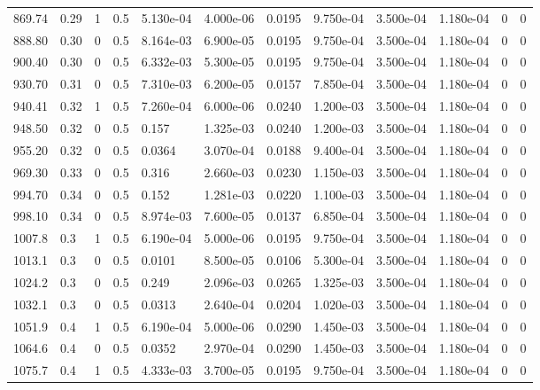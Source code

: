 \documentclass[preview]{standalone}
\begin{document}
{{{\begin{tabular}{L{1.2cm}C{1.2cm} C{0.3cm}C{0.5cm} C{1.4cm}C{1.4cm} C{1.4cm}C{1.4cm} C{1.6cm}C{1.6cm} C{1.6cm}C{1.6cm}}
  869.74  &  0.29  & 1     & 0.5 &  5.130e-04  & 4.000e-06  &  0.0195&   9.750e-04& 3.500e-04 & 1.180e-04   &  0 & 0  \\ 
  888.80  &  0.30  & 0     & 0.5 &  8.164e-03  & 6.900e-05  &  0.0195&   9.750e-04& 3.500e-04 & 1.180e-04   &  0 & 0  \\ 
  900.40  &  0.30  & 0     & 0.5 &  6.332e-03  & 5.300e-05  &  0.0195&   9.750e-04& 3.500e-04 & 1.180e-04   &  0 & 0  \\ 
  930.70  &  0.31  & 0     & 0.5 &  7.310e-03  & 6.200e-05  &  0.0157&   7.850e-04& 3.500e-04 & 1.180e-04   &  0 & 0  \\ 
  940.41  &  0.32  & 1     & 0.5 &  7.260e-04  & 6.000e-06  &  0.0240&   1.200e-03& 3.500e-04 & 1.180e-04   &  0 & 0  \\ 
  948.50  &  0.32  & 0     & 0.5 &  0.157  & 1.325e-03  &  0.0240&   1.200e-03& 3.500e-04 & 1.180e-04   &  0 & 0  \\ 
  955.20  &  0.32  & 0     & 0.5 &  0.0364  & 3.070e-04  &  0.0188&   9.400e-04& 3.500e-04 & 1.180e-04   &  0 & 0  \\ 
  969.30  &  0.33  & 0     & 0.5 &  0.316  & 2.660e-03  &  0.0230&   1.150e-03& 3.500e-04 & 1.180e-04   &  0 & 0  \\ 
  994.70  &  0.34  & 0     & 0.5 &  0.152  & 1.281e-03  &  0.0220&   1.100e-03& 3.500e-04 & 1.180e-04   &  0 & 0  \\ 
  998.10  &  0.34  & 0     & 0.5 &  8.974e-03  & 7.600e-05  &  0.0137&   6.850e-04& 3.500e-04 & 1.180e-04   &  0 & 0  \\ 
  1007.8  &   0.3  & 1     & 0.5 &  6.190e-04  & 5.000e-06  &  0.0195&   9.750e-04& 3.500e-04 & 1.180e-04   &  0 & 0  \\ 
  1013.1  &   0.3  & 0     & 0.5 &  0.0101  & 8.500e-05  &  0.0106&   5.300e-04& 3.500e-04 & 1.180e-04   &  0 & 0  \\ 
  1024.2  &   0.3  & 0     & 0.5 &  0.249  & 2.096e-03  &  0.0265&   1.325e-03& 3.500e-04 & 1.180e-04   &  0 & 0  \\ 
  1032.1  &   0.3  & 0     & 0.5 &  0.0313  & 2.640e-04  &  0.0204&   1.020e-03& 3.500e-04 & 1.180e-04   &  0 & 0  \\ 
  1051.9  &   0.4  & 1     & 0.5 &  6.190e-04  & 5.000e-06  &  0.0290&   1.450e-03& 3.500e-04 & 1.180e-04   &  0 & 0  \\ 
  1064.6  &   0.4  & 0     & 0.5 &  0.0352  & 2.970e-04  &  0.0290&   1.450e-03& 3.500e-04 & 1.180e-04   &  0 & 0  \\ 
  1075.7  &   0.4  & 1     & 0.5 &  4.333e-03  & 3.700e-05  &  0.0195&   9.750e-04& 3.500e-04 & 1.180e-04   &  0 & 0  \\ 

\end{tabular}}}}
\end{document}
